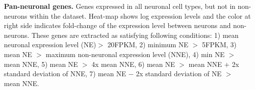 \textbf{Pan-neuronal genes.} 
Genes expressed in all neuronal cell types, but not in non-neurons within the dataset. Heat-map shows log expression levels and the color at right side indicates fold-change of the expression level between neurons and non-neurons. These genes are extracted as satisfying following conditions: 1) mean neuronal expression level (NE)$>$ 20FPKM, 2) minimum NE $>$ 5FPKM, 3) mean NE $>$ maximum non-neuronal expression level (NNE), 4) min NE $>$ mean NNE, 5) mean NE $>$ 4x mean NNE, 6) mean NE $>$ mean NNE $+$ 2x standard deviation of NNE, 7) mean NE $-$ 2x standard deviation of NE $>$ mean NNE. 




